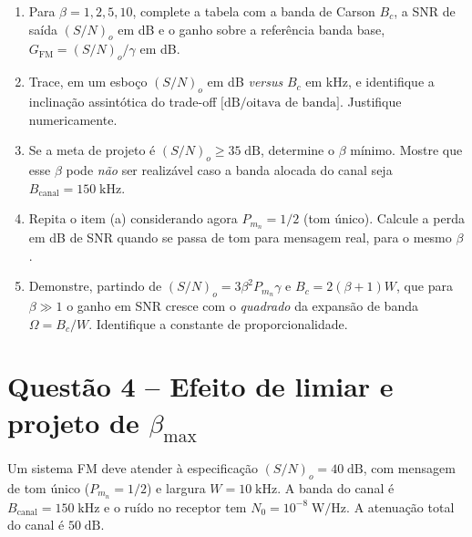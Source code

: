 \documentclass[11pt,a4paper]{article}
\begin{document}
\begin{enumerate}[label=\alph*)]
  \item Para $\beta = 1, 2, 5, 10$, complete a tabela com a banda de Carson $B_c$, a SNR de saída $(S/N)_o$ em dB e o ganho sobre a referência banda base, $G_{\text{FM}} = (S/N)_o/\gamma$ em dB.
  \item Trace, em um esboço $(S/N)_o$ em dB \emph{versus} $B_c$ em kHz, e identifique a inclinação assintótica do trade-off $\big[\text{dB}/\text{oitava de banda}\big]$. Justifique numericamente.
  \item Se a meta de projeto é $(S/N)_o \ge 35\;\text{dB}$, determine o $\beta$ mínimo. Mostre que esse $\beta$ pode \emph{não} ser realizável caso a banda alocada do canal seja $B_{\text{canal}} = 150\;\text{kHz}$.
  \item Repita o item (a) considerando agora $P_{m_n} = 1/2$ (tom único). Calcule a perda em dB de SNR quando se passa de tom para mensagem real, para o mesmo $\beta$.
  \item Demonstre, partindo de $(S/N)_o = 3\beta^2 P_{m_n}\gamma$ e $B_c = 2(\beta+1)W$, que para $\beta \gg 1$ o ganho em SNR cresce com o \emph{quadrado} da expansão de banda $\Omega = B_c/W$. Identifique a constante de proporcionalidade.
\end{enumerate}

\section*{Questão 4 -- Efeito de limiar e projeto de $\beta_{\max}$}

Um sistema FM deve atender à especificação $(S/N)_o = 40\;\text{dB}$, com mensagem de tom único ($P_{m_n} = 1/2$) e largura $W = 10\;\text{kHz}$. A banda do canal é $B_{\text{canal}} = 150\;\text{kHz}$ e o ruído no receptor tem $N_0 = 10^{-8}\;\text{W/Hz}$. A atenuação total do canal é $50\;\text{dB}$.
\end{document}
